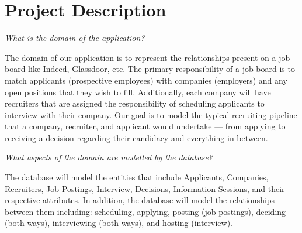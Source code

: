 \setcounter{section}{1}
\section{Project Description}

\textit{What is the domain of the application?} 

The domain of our application is to represent the relationships present on a job board like Indeed, Glassdoor, etc. The primary responsibility of a job board is to match applicants (prospective employees) with companies (employers) and any open positions that they wish to fill. Additionally, each company will have recruiters that are assigned the responsibility of scheduling applicants to interview with their company. Our goal is to model the typical recruiting pipeline that a company, recruiter, and applicant would undertake --- from applying to receiving a decision regarding their candidacy and everything in between. 

\medskip 

\textit{What aspects of the domain are modelled by the database?} 

The database will model the entities that include Applicants, Companies, Recruiters, Job Postings, Interview, Decisions, Information Sessions, and their respective attributes. In addition,
the database will model the relationships between them including: scheduling, applying, posting (job postings), deciding (both ways), interviewing (both ways), and hosting (interview).
